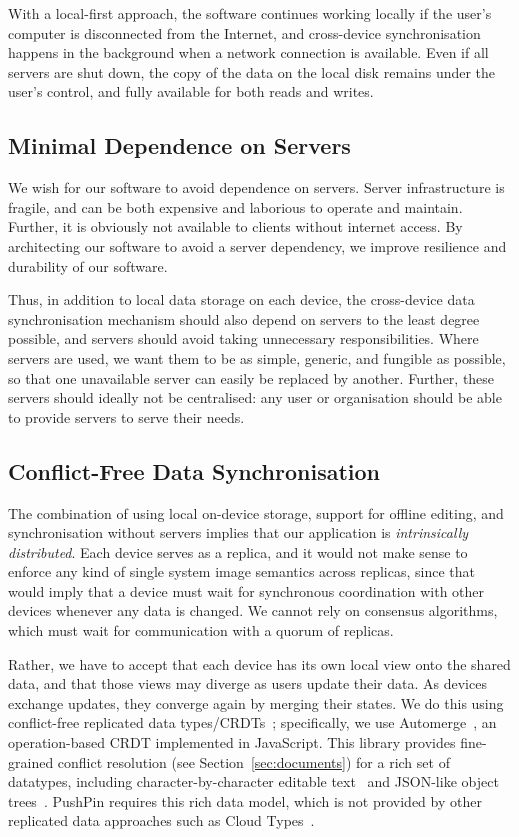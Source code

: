 \documentclass[sigplan,10pt]{acmart}
\begin{document}
With a local-first approach, the software continues working locally if the user's computer is disconnected from the Internet, and cross-device synchronisation happens in the background when a network connection is available.
Even if all servers are shut down, the copy of the data on the local disk remains under the user's control, and fully available for both reads and writes.

\subsection{Minimal Dependence on Servers}

We wish for our software to avoid dependence on servers. Server infrastructure is fragile, and can be both expensive and laborious to operate and maintain. Further, it is obviously not available to clients without internet access. By architecting our software to avoid a server dependency, we improve resilience and durability of our software.

Thus, in addition to local data storage on each device, the cross-device data synchronisation mechanism should also depend on servers to the least degree possible, and servers should avoid taking unnecessary responsibilities. Where servers are used, we want them to be as simple, generic, and fungible as possible, so that one unavailable server can easily be replaced by another. Further, these servers should ideally not be centralised: any user or organisation should be able to provide servers to serve their needs.

\subsection{Conflict-Free Data Synchronisation}

The combination of using local on-device storage, support for offline editing, and synchronisation without servers implies that our application is \emph{intrinsically distributed}.
Each device serves as a replica, and it would not make sense to enforce any kind of single system image semantics across replicas, since that would imply that a device must wait for synchronous coordination with other devices whenever any data is changed.
We cannot rely on consensus algorithms, which must wait for communication with a quorum of replicas.

Rather, we have to accept that each device has its own local view onto the shared data, and that those views may diverge as users update their data.
As devices exchange updates, they converge again by merging their states.
We do this using conflict-free replicated data types/CRDTs~\cite{Shapiro:2011un}; specifically, we use Automerge~\cite{Automerge:2018,Automerge}, an operation-based CRDT implemented in JavaScript.
This library provides fine-grained conflict resolution (see Section~\ref{sec:documents}) for a rich set of datatypes, including character-by-character editable text~\cite{Kleppmann:2019iu} and JSON-like object trees~\cite{Kleppmann:2017ca}.
PushPin requires this rich data model, which is not provided by other replicated data approaches such as Cloud Types~\cite{Burckhardt:2012jy}.
\end{document}
